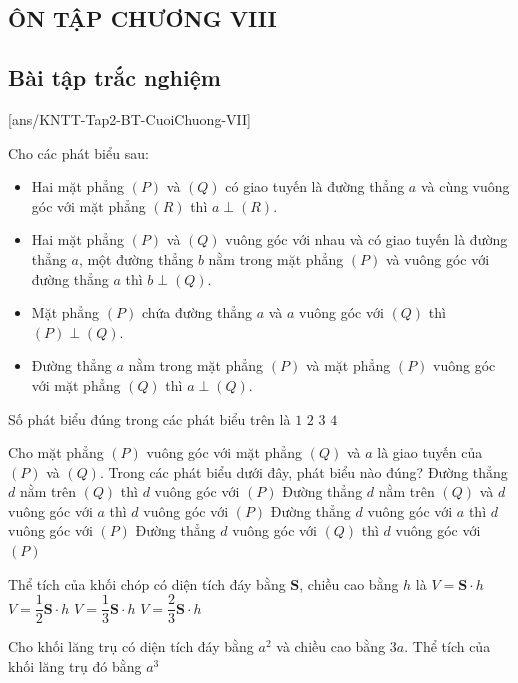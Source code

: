 \begin{bt}
\section*{ÔN TẬP CHƯƠNG VIII}
\subsection{Bài tập trắc nghiệm}
[ans/KNTT-Tap2-BT-CuoiChuong-VII]
\begin{ex}%
	Cho các phát biểu sau:
	\begin{itemize}
	\item Hai mặt phẳng $(P)$ và $(Q)$ có giao tuyến là đường thẳng $a$ và cùng vuông góc với mặt phẳng $(R)$ thì $a\perp(R)$.
	\item Hai mặt phẳng $(P)$ và $(Q)$ vuông góc với nhau và có giao tuyến là đường thẳng $a$, một đường thẳng $b$ nằm trong mặt phẳng $(P)$ và vuông góc với đường thẳng $a$ thì $b\perp(Q)$.
	\item Mặt phẳng $(P)$ chứa đường thẳng $a$ và $a$ vuông góc với $(Q)$ thì $(P)\perp(Q)$.
	\item Đường thẳng $a$ nằm trong mặt phẳng $(P)$ và mặt phẳng $(P)$ vuông góc với mặt phẳng $(Q)$ thì $a\perp(Q)$.
	\end{itemize}
	Số phát biểu đúng trong các phát biểu trên là
	\choice
	{$1$}
	{$2$}
	{\True $3$}
	{$4$} 
\end{ex}
\begin{ex}%
	Cho mặt phẳng $(P)$ vuông góc với mặt phẳng $(Q)$ và $a$ là giao tuyến của $(P)$ và $(Q)$. Trong các phát biểu dưới đây, phát biểu nào đúng?
	\choice
	{Đường thẳng $d$ nằm trên $(Q)$ thì $d$ vuông góc với $(P)$}
	{\True Đường thẳng $d$ nằm trên $(Q)$ và $d$ vuông góc với $a$ thì $d$ vuông góc với $(P)$}
	{Đường thẳng $d$ vuông góc với $a$ thì $d$ vuông góc với $(P)$}
	{Đường thẳng $d$ vuông góc với $(Q)$ thì $d$ vuông góc với $(P)$}
	\loigiai{}
\end{ex}
\begin{ex}%
	Thể tích của khối chóp có diện tích đáy bằng $\mathbf{S}$, chiều cao bằng $h$ là
	\choice
	{$V=\mathbf{S}\cdot h$}
	{$V=\dfrac{1}{2}\mathbf{S}\cdot h$}
	{\True $V=\dfrac{1}{3}\mathbf{S}\cdot h$}
	{$V=\dfrac{2}{3}\mathbf{S}\cdot h$}
	\loigiai{}
\end{ex}
\begin{ex}%
	Cho khối lăng trụ có diện tích đáy bằng $a^2$ và chiều cao bằng $3a$. Thể tích của khối lăng trụ đó bằng
	\choice
	{$a^3$}

\end{ex}
\end{bt}

